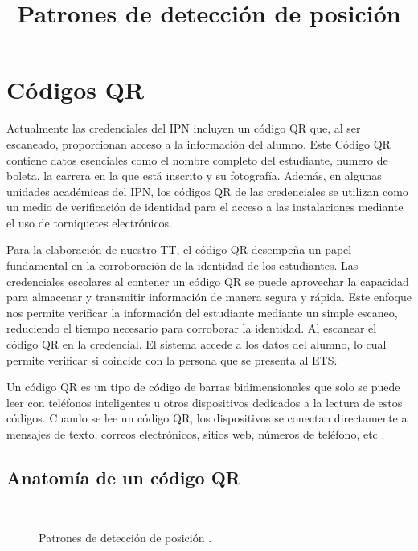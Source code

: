 
\section{Códigos QR}

Actualmente las credenciales del IPN incluyen un código QR que, al ser escaneado, proporcionan acceso a la información del alumno.
Este Código QR contiene datos esenciales como el nombre completo del estudiante, numero de boleta, la carrera en la que está inscrito y su fotografía. Además, en algunas unidades académicas del IPN, los códigos QR de las credenciales se utilizan como un medio de verificación de identidad para el acceso a las instalaciones mediante el uso de torniquetes electrónicos.

Para la elaboración de nuestro TT, el código QR desempeña un papel fundamental en la corroboración de la identidad de los estudiantes. Las credenciales escolares al contener un código QR se puede aprovechar la capacidad para almacenar y transmitir información de manera segura y rápida. Este enfoque nos permite verificar la información del estudiante mediante un simple escaneo, reduciendo el tiempo necesario para corroborar la identidad. Al escanear el código QR en la credencial. El sistema accede a los datos del alumno, lo cual permite verificar si coincide con la persona que se presenta al ETS.

Un código QR es un tipo de código de barras bidimensionales que solo se puede leer con teléfonos inteligentes u otros dispositivos dedicados a la lectura de estos códigos. Cuando se lee un código QR, los dispositivos se conectan directamente a mensajes de texto, correos electrónicos, sitios web, números de teléfono, etc \cite{CitaA01}.

\subsection{Anatomía de un código QR}
\title{Patrones de detección de posición}\\

\begin{figure}[htbp]
	\begin{center}
		\caption{Patrones de detección de posición \cite{CitaA01}.}
		\label{fig:Patrones de deteccion de posicion2}
	\end{center}
\end{figure}

